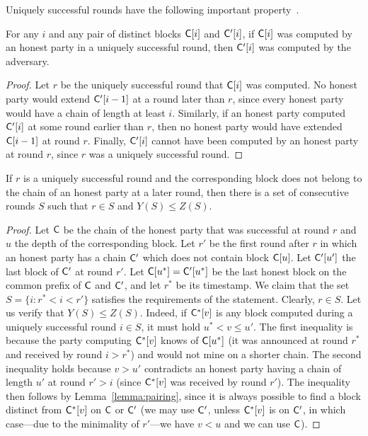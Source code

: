 Uniquely successful rounds have the following important property~\cite{backbone-new}.
\begin{lemma}[Pairing]\label{lemma:pairing}
	For any $i$ and any pair of distinct blocks $\mathsf{C}[i]$ and
	$\mathsf{C}'[i]$, if $\mathsf{C}[i]$ was computed by an honest party in a uniquely
	successful round, then $\mathsf{C}'[i]$ was computed by the adversary.
\end{lemma}
\begin{proof}
	Let $r$ be the uniquely successful round that $\mathsf{C}[i]$ was computed.
	No honest party would extend $\mathsf{C}'[i-1]$ at a round later than $r$, since
	every honest party would have a chain of length at least $i$.
	Similarly, if an honest party computed $\mathsf{C}'[i]$ at some round
	earlier than $r$, then no honest party would have extended $\mathsf{C}[i-1]$ at
	round $r$.
	Finally, $\mathsf{C}'[i]$ cannot have been computed by an honest party at round
	$r$, since $r$ was a uniquely successful round.
\end{proof}

\begin{lemma}[Suppression]\label{lemma:balanced}
	If $r$ is a uniquely successful round and the corresponding block
	does not belong to the chain of an honest party at a later round,
	then there is a set of consecutive rounds $S$ such that
	$r\in S$ and $Y(S)\leq Z(S)$.
\end{lemma}
\begin{proof}
	Let $\mathsf{C}$ be the chain of the honest party that was successful at round
	$r$ and $u$ the depth of the corresponding block.
	Let $r'$ be the first round after $r$ in which an honest party has a chain
	$\mathsf{C}'$ which does not contain block $\mathsf{C}[u]$. Let $\mathsf{C}'[u']$ the
	last block of $\mathsf{C}'$ at round $r'$.
	Let $\mathsf{C}[u^*]=\mathsf{C}'[u^*]$ be the last honest block on the common prefix
	of $\mathsf{C}$ and $\mathsf{C}'$, and let $r^*$ be its timestamp.
	We claim that the set $S=\{i:r^*<i<r'\}$ satisfies the requirements of the
	statement.
	Clearly, $r\in S$. Let us verify that $Y(S)\leq Z(S)$.
	Indeed, if $\mathsf{C}^*[v]$ is any block computed during a uniquely successful
	round $i\in S$, it must hold $u^*<v\leq u'$. The first inequality is because
	the party computing $\mathsf{C}^*[v]$ knows of $\mathsf{C}[u^*]$ (it was announced
	at round $r^*$ and received by round $i>r^*$) and would not mine on
	a shorter chain.
	The second inequality holds because $v>u'$ contradicts an honest party
	having a chain of length $u'$ at round $r'>i$ (since $\mathsf{C}^*[v]$ was
	received by round $r'$).
	The inequality then follows by Lemma~\ref{lemma:pairing}, since it is always
	possible to find a block distinct from $\mathsf{C}^*[v]$ on $\mathsf{C}$ or
	$\mathsf{C}'$ (we may use $\mathsf{C}'$, unless $\mathsf{C}^*[v]$ is on $\mathsf{C}'$, in
	which case---due to the minimality of $r'$---we have $v<u$ and we can use
	$\mathsf{C}$).
\end{proof}

